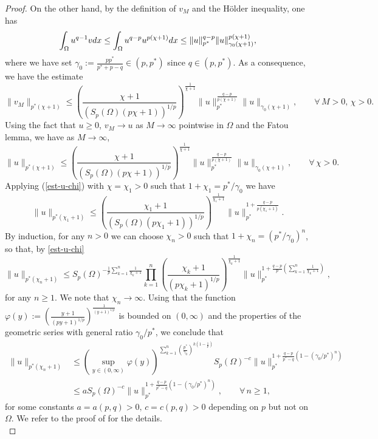 \documentclass[11pt,reqno]{amsart}
\theoremstyle{definition}
\numberwithin{equation}{section}
\numberwithin{theorem}{section}
\numberwithin{equation}{section}
\numberwithin{theorem}{section}
\begin{document}
\begin{proof}
On the other hand, by the definition of $v_M$ and the H\"older inequality, one has
\begin{equation}\notag
\int_\Omega u^{q-1}v dx\le\int_\Omega u^{q-p}u^{p(\chi+1)} dx\le \|u\|_{p^*}^{q-p}\|u\|^{p(\chi+1)}_{\gamma_0(\chi+1)},
\end{equation}
where we have set $\gamma_0:=\frac{p p^*}{p^*+p-q}\in(p,p^*)$ since $q\in(p,p^*)$. As a consequence, we have the estimate
$$\|v_M\|_{p^*(\chi+1)}\le \left(\frac{\chi+1}{(S_p(\Omega)(p\chi+1))^{1/p}}\right)^{\frac{1}{\chi+1}}\|u\|_{p^*}^{\frac{q-p}{p(\chi+1)}}\|u\|_{\gamma_0(\chi+1)},\qquad\forall\,M>0,\,\chi>0.$$
Using the fact that $u\ge 0$, $v_M\to u$ as $M\to\infty$ pointwise in $\Omega$ and the Fatou lemma,  we have as $M\to\infty$,
\begin{equation}\label{est-u-chi}
\|u\|_{p^*(\chi+1)}\le \left(\frac{\chi+1}{(S_p(\Omega)(p\chi+1))^{1/p}}\right)^{\frac{1}{\chi+1}}\|u\|_{p^*}^{\frac{q-p}{p(\chi+1)}}\|u\|_{\gamma_0(\chi+1)},\qquad\forall\,\chi>0. \end{equation}
Applying (\ref{est-u-chi}) with $\chi=\chi_1>0$ such that $1+\chi_1=p^*/\gamma_0$ we have
$$\|u\|_{p^*(\chi_1+1)}\le \left(\frac{\chi_1+1}{(S_p(\Omega)(p\chi_1+1))^{1/p}}\right)^{\frac{1}{\chi_1+1}}\|u\|_{p^*}^{1+\frac{q-p}{p(\chi_1+1)}}.$$
By induction, for any $n>0$ we can choose $\chi_n>0$ such that $1+\chi_n=(p^*/\gamma_0)^n$, so that, by \eqref{est-u-chi}
$$\|u\|_{p^*(\chi_n+1)}\le S_p(\Omega)^{-\frac{1}{p}\sum_{k=1}^n\frac{1}{\chi_k+1}}\prod_{k=1}^n\left(\frac{\chi_k+1}{(p\chi_k+1)^{1/p}}\right)^{\frac{1}{\chi_k+1}}\|u\|_{p^*}^{1+\frac{q-p}{p}\left(\sum_{k=1}^n\frac{1}{\chi_k+1}\right)},$$
for any $n\ge 1$. We note that $\chi_n\to\infty$. Using that the function $\varphi(y):=\left(\frac{y+1}{(py+1)^{1/p}}\right)^{\frac{1}{(y+1)^{1/p}}}$ is bounded on $(0,\infty)$ and the properties of the geometric series with general ratio $\gamma_0/p^*$, we conclude that
\begin{equation}
\begin{aligned}
\|u\|_{p^*(\chi_n+1)}&\le (\sup_{y\in(0,\infty)}\varphi(y))^{\sum_{k=1}^n\left(\frac{p^*}{\gamma_0}\right)^{k\left(1-\frac{1}{p}\right)}}S_p(\Omega)^{-c}\|u\|_{p^*}^{1+\frac{q-p}{p^*-q}(1-(\gamma_0/p^*)^n)}\\
&\le a S_p(\Omega)^{-c}\|u\|_{p^*}^{1+\frac{q-p}{p^*-q}(1-(\gamma_0/p^*)^n)},\qquad\forall\, n\ge 1,   
\end{aligned}   
\end{equation}
for some constants $a=a(p,q)>0,\,c=c(p,q)>0$ depending on $p$ but not on $\Omega$. We refer to the proof of \cite[Theorem 1.3]{PWZ} for the details.\\
								

\end{proof}
\end{document}
